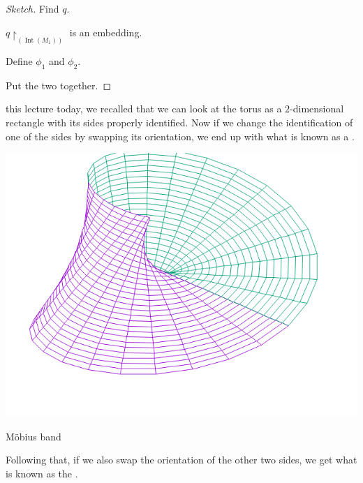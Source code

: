 \documentclass[notoc,notitlepage]{tufte-book}
\DeclareMathOperator{\Int}{Int}
\begin{document}
\begin{proof}[Sketch]
   Find $q$.

  \noindent
   $q \restriction_(\Int(M_1))$ is an embedding.

  \noindent
   Define $\phi_1$ and $\phi_2$.

  \noindent
   Put the two together.

\end{proof}

 this lecture today, we recalled that we can look at the torus as a
$2$-dimensional rectangle with its sides properly identified. Now if we change the
identification of one of the sides by swapping its orientation, we end up with what is
known as a .

\begin{marginfigure}
  \centering
  \includegraphics[width=\marginparwidth]{images/mobius-band1.png}
  \caption{M\"{o}bius band}\label{fig:mobius_band}
\end{marginfigure}

Following that, if we also swap the orientation of the other two sides, we get what is known as
the .
\end{document}

